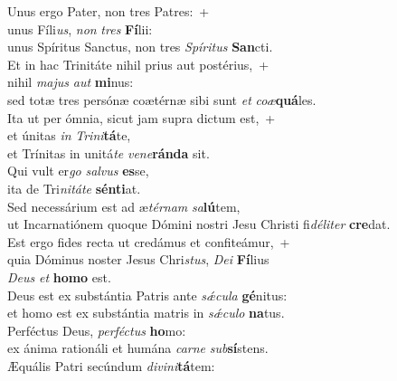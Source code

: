 \oddverse Unus ergo Pater, non tres Patres:~+\\
\oddverse  unus Fíli\textit{us}, \textit{non} \textit{tres} \textbf{Fí}lii:~\*\\
\oddverse unus Spíritus Sanctus, non tres \textit{Spí}\textit{ri}\textit{tus} \textbf{San}cti.\\
\evenverse Et in hac Trinitáte nihil prius aut postérius,~+\\
\evenverse  nihil \textit{ma}\textit{jus} \textit{aut} \textbf{mi}nus:~\*\\
\evenverse sed totæ tres persónæ coætérnæ sibi sunt \textit{et} \textit{co}\textit{æ}\textbf{quá}les.\\
\oddverse Ita ut per ómnia, sicut jam supra dictum est,~+\\
\oddverse  et únitas \textit{in} \textit{Tri}\textit{ni}\textbf{tá}te,~\*\\
\oddverse et Trínitas in unitá\textit{te} \textit{ve}\textit{ne}\textbf{rán}\textbf{da} sit.\\
\evenverse Qui vult er\textit{go} \textit{sal}\textit{vus} \textbf{es}se,~\*\\
\evenverse ita de Tri\textit{ni}\textit{tá}\textit{te} \textbf{sén}\textbf{ti}at.\\
\oddverse Sed necessárium est ad æ\textit{tér}\textit{nam} \textit{sa}\textbf{lú}tem,~\*\\
\oddverse ut Incarnatiónem quoque Dómini nostri Jesu Christi fi\textit{dé}\textit{li}\textit{ter} \textbf{cre}dat.\\
\evenverse Est ergo fides recta ut credámus et confiteámur,~+\\
\evenverse  quia Dóminus noster Jesus Chri\textit{stus}, \textit{De}\textit{i} \textbf{Fí}lius~\*\\
\evenverse \textit{De}\textit{us} \textit{et} \textbf{ho}\textbf{mo} est.\\
\oddverse Deus est ex substántia Patris ante \textit{sǽ}\textit{cu}\textit{la} \textbf{gé}nitus:~\*\\
\oddverse et homo est ex substántia matris in \textit{sǽ}\textit{cu}\textit{lo} \textbf{na}tus.\\
\evenverse Perféctus Deus, \textit{per}\textit{fé}\textit{ctus} \textbf{ho}mo:~\*\\
\evenverse ex ánima rationáli et humána \textit{car}\textit{ne} \textit{sub}\textbf{sí}stens.\\
\oddverse Æquális Patri secúndum \textit{di}\textit{vi}\textit{ni}\textbf{tá}tem:~\*\\
